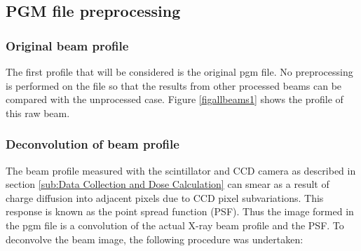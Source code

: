 \subsection{PGM file preprocessing}
\label{sub:PGM file preprocessing}

\subsubsection{Original beam profile}
\label{subs:Original beam profile}
The first profile that will be considered is the original pgm file. No preprocessing is performed on the file so that the results from other processed beams can be compared with the unprocessed case. Figure \ref{figallbeams1} shows the profile of this raw beam.

\subsubsection{Deconvolution of beam profile}
\label{subs:Deconvolution of beam profile}
The beam profile measured with the scintillator and CCD camera as described in section \ref{sub:Data Collection and Dose Calculation} can smear as a result of charge diffusion into adjacent pixels due to CCD pixel subvariations.
This response is known as the point spread function (PSF).
Thus the image formed in the pgm file is a convolution of the actual X-ray beam profile and the PSF.
To deconvolve the beam image, the following procedure was undertaken:
